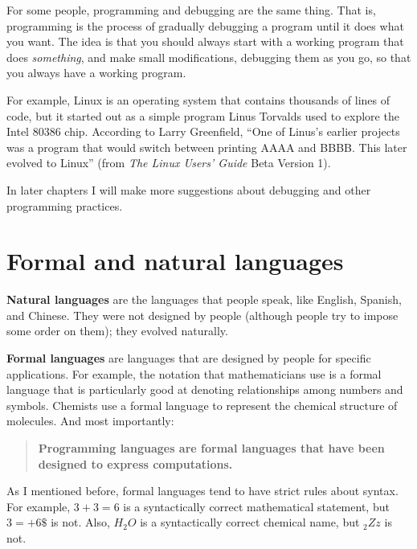 
For some people, programming and debugging are the
same thing.  That is, programming is the process of gradually
debugging a program until it does what you want.  The idea
is that you should always start with a working program that
does {\em something}, and make small modifications, debugging
them as you go, so that you always have a working program.

For example, Linux is an operating system that contains thousands of
lines of code, but it started out as a simple program Linus Torvalds
used to explore the Intel 80386 chip.  According to Larry Greenfield,
``One of Linus's earlier projects was a program that would switch
between printing AAAA and BBBB.  This later evolved to Linux''
(from {\em The Linux Users' Guide} Beta Version 1).


In later chapters I will make more suggestions about debugging
and other programming practices.

\section{Formal and natural languages}
\label{formal}

{\bf Natural languages} are the languages that people speak,
like English, Spanish, and Chinese.  They were not designed
by people (although people try to impose some order on them);
they evolved naturally.

{\bf Formal languages} are languages that are designed by people for
specific applications.  For example, the notation that mathematicians
use is a formal language that is particularly good at denoting
relationships among numbers and symbols.  Chemists use a formal
language to represent the chemical structure of molecules.  And
most importantly:

\begin{quote}
{\bf Programming languages are formal languages that have been
designed to express computations.}
\end{quote}

As I mentioned before, formal languages tend to have strict rules
about syntax.  For example, $3+3=6$ is a syntactically correct
mathematical statement, but $3=+6\$$ is not.  Also, $H_2O$ is a
syntactically correct chemical name, but $_2Zz$ is not.

